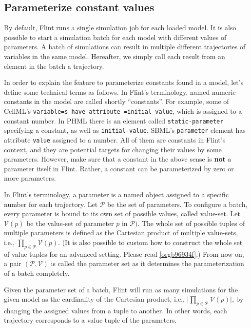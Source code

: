 \documentclass[a4paper,10pt]{report}
\begin{document}
\subsection{Parameterize constant values}
\label{sec:org6f71c0a}
By default, Flint runs a single simulation job for each loaded model.
It is also possible to start a simulation batch for each model with
different values of parameters.
A batch of simulations can result in multiple different trajectories of
variables in the same model. Hereafter, we simply call each result from
an element in the batch a trajectory.

In order to explain the feature to parameterize constants found in a model,
let's define some technical terms as follows.
In Flint's terminology, named numeric constants in the model are called
shortly ``constants''.
For example, some of CellML's \texttt{variable=s have attribute
=initial\_value}, which is assigned to a constant number.
In PHML there is an element called \texttt{static-parameter} specifying a constant,
as well as \texttt{initial-value}.
SBML's \texttt{parameter} element has attribute \texttt{value} assigned to a number.
All of them are constants in Flint's context, and they are potential targets for
changing their values by some parameters.
However, make sure that a constant in the above sense is \textbf{not} a parameter
itself in Flint.
Rather, a constant can be parameterized by zero or more parameters.

In Flint's terminology, a parameter is a named object assigned to a specific
number for each trajectory.
Let \(\mathcal{P}\) be the set of parameters.
To configure a batch, every parameter is bound to its own set of possible
values, called value-set.
Let \(\mathcal{V}(p)\) be the value-set of parameter \(p\) in \(\mathcal{P})\).
The whole set of possible tuples of multiple parameters is defined as the
Cartesian product of multiple value-sets, i.e., \(\prod_{p \in \mathcal{P}}
\mathcal{V}(p)\).
(It is also possible to custom how to construct the whole set of value tuples
for an advanced setting. Please read \ref{orgb96934f}.)
From now on, a pair \((\mathcal{P}, \mathcal{V})\) is called the parameter set as
it determines the parameterization of a batch completely.

Given the parameter set of a batch, Flint will run as many simulations for the
given model as the cardinality of the Cartesian product, i.e.,
\(\lvert \prod_{p \in \mathcal{P}} \mathcal{V}(p) \rvert\), by changing the
assigned values from a tuple to another.
In other words, each trajectory corresponds to a value tuple of the parameters.
\end{document}
